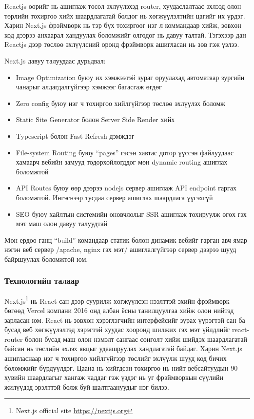 Reactjs өөрийг нь ашиглаж төсөл эхлүүлэхэд router, хуудаслалтаас эхлээд олон төрлийн тохиргоо хийх шаардлагатай болдог нь хөгжүүлэлтийн цагийг их үрдэг. Харин Next.js фрэймворк нь тэр бүх тохиргоог нэг л коммандаар хийж, зөвхөн код дээрээ анхаарал хандуулах боломжийг олгодог нь давуу талтай. Тэгэхээр дан Reactjs дээр төслөө эхлүүлсний оронд фрэймворк ашигласан нь зөв гэж үзлээ.

Next.js давуу талуудаас дурьдвал:
\begin{itemize}
	\item Image Optimization буюу их хэмжээтэй зураг оруулахад автоматаар зургийн чанарыг алдагдалгүйгээр хэмжээг багасгаж өгдөг
	\item Zero config буюу нэг ч тохиргоо хийлгүйгээр төслөө эхлүүлэх боломж
	\item Static Site Generator болон Server Side Render хийх
	\item Typescript болон Fast Refresh дэмждэг
	\item File-system Routing буюу “pages” гэсэн хавтас дотор үүссэн файлуудаас хамаарч вебийн замууд тодорхойлогддог мөн dynamic routing ашиглах боломжтой
	\item API Routes буюу өөр дээрээ nodejs сервер ашиглаж API endpoint гаргах боломжтой. Ингэснээр тусдаа сервер ашиглах шаардлага үүсэхгүй 
	\item SEO буюу хайлтын системийн оновчлолыг SSR ашиглаж тохируулж өгөх гэх мэт маш олон давуу талуудтай
\end{itemize}

Мөн ердөө ганц “build” командаар статик болон динамик вебийг гарган авч ямар нэгэн веб сервер /apache, nginx гэх мэт/ ашиглалгүйгээр сервер дээрээ шууд байршуулах боломжтой юм.

\subsubsection{Технологийн талаар}

Next.js\footnote{Next.js official site \url{https://nextjs.org}} нь React сан дээр суурилж хөгжүүлсэн нээлттэй эхийн фрэймворк бөгөөд Vercel компани 2016 онд албан ёсны танилцуулгаа хийж олон нийтэд зарласан юм. React нь зөвхөн хэрэглэгчийн интерфейсийг зурах үүрэгтэй сан ба бусад веб хөгжүүлэлтэд хэрэгтэй хуудас хооронд шилжих гэх мэт үйлдлийг react-router болон бусад маш олон нэмэлт сангаас сонголт хийж шийдэх шаардлагатай байсан нь төслийн эхлэх явцыг удаашруулах хандлагатай байдаг. Харин Next.js ашигласнаар нэг ч тохиргоо хийлгүйгээр төслийг эхлүүлж шууд код бичих боломжийг бүрдүүлдэг. Цаана нь хийгдсэн тохиргоо нь нийт вебсайтуудын 90 хувийн шаардлагыг хангаж чаддаг гэж үздэг нь уг фрэймворкын сүүлийн жилүүдэд эрэлттэй болж буй шалтгаануудыг нэг билээ.


